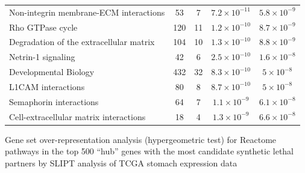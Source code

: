 \begin{table}[!ht]
{\begin{threeparttable}
\begin{tabular}{lcccc}
  \rowcolor{black!10}
  Non-integrin membrane-ECM interactions &  53 &   7 & $7.2 \times 10^{-11}$ & $5.8 \times 10^{-9}$ \\ 
  \rowcolor{black!5}
  Rho GTPase cycle & 120 &  11 & $1.2 \times 10^{-10}$ & $8.7 \times 10^{-9}$ \\ 
  \rowcolor{black!10}
  Degradation of the extracellular matrix & 104 &  10 & $1.3 \times 10^{-10}$ & $8.8 \times 10^{-9}$ \\ 
  \rowcolor{black!5}
  Netrin-1 signaling &  42 &   6 & $2.5 \times 10^{-10}$ & $1.6 \times 10^{-8}$ \\ 
  \rowcolor{black!10}
  Developmental Biology & 432 &  32 & $8.3 \times 10^{-10}$ & $5 \times 10^{-8}$ \\ 
  \rowcolor{black!5}
  L1CAM interactions &  80 &   8 & $8.7 \times 10^{-10}$ & $5 \times 10^{-8}$ \\ 
  \rowcolor{black!10}
  Semaphorin interactions &  64 &   7 & $1.1 \times 10^{-9}$ & $6.1 \times 10^{-8}$ \\ 
  \rowcolor{black!5}
  Cell-extracellular matrix interactions &  18 &   4 & $1.3 \times 10^{-9}$ & $6.6 \times 10^{-8}$ \\ 
   \hline
\end{tabular}
\begin{tablenotes}
\raggedright \small
Gene set over-representation analysis (hypergeometric test) for Reactome pathways in the top 500 ``hub'' genes with the most candidate synthetic lethal partners by SLIPT analysis of TCGA stomach expression data
\end{tablenotes}
\end{threeparttable}
}
\end{table}